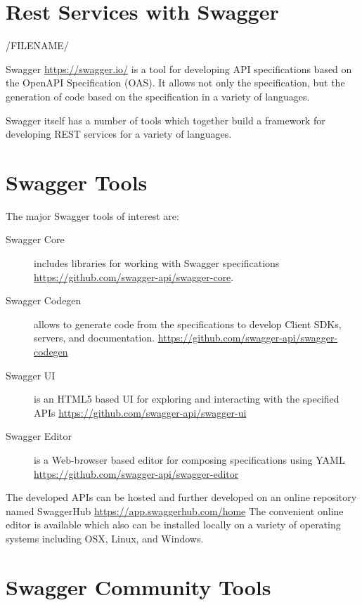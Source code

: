 

\section{Rest Services with Swagger}

/FILENAME/

Swagger \url{https://swagger.io/} is a tool for developing API
specifications based on the OpenAPI Specification (OAS). It allows not
only the specification, but the generation of code based on the
specification in a variety of languages.

Swagger itself has a number of tools which together build a framework
for developing REST services for a variety of languages.


\section{Swagger Tools}

The major Swagger tools of interest are:

\begin{description}

\item[Swagger Core] includes libraries for working with Swagger
 specifications \url{https://github.com/swagger-api/swagger-core}.

\item[Swagger Codegen] allows to generate code from the specifications
 to develop Client SDKs, servers, and documentation. \url{https://github.com/swagger-api/swagger-codegen}

\item[Swagger UI] is an HTML5 based UI for exploring and interacting
 with the specified APIs \url{https://github.com/swagger-api/swagger-ui}

\item[Swagger Editor] is a Web-browser based editor for composing 
 specifications using YAML \url{https://github.com/swagger-api/swagger-editor}

\end{description}

The developed APIs can be hosted and further developed on an
online repository named SwaggerHub \url{https://app.swaggerhub.com/home}
The convenient online editor is available which also can be installed
locally on a variety of operating systems including OSX, Linux, and
Windows. 

\section{Swagger Community Tools}

